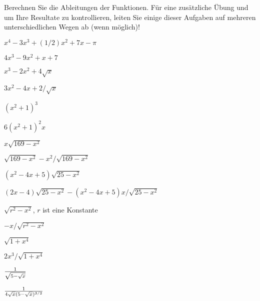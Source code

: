 \begin{exercises}

\noindent 
Berechnen Sie die Ableitungen der Funktionen. Für eine zusätzliche Übung und um Ihre Resultate zu kontrollieren, leiten Sie einige dieser Aufgaben auf mehreren unterschiedlichen Wegen ab (wenn möglich)!

\twocol

\begin{exercise} $x^4-3x^3+(1/2)x^2+7x-\pi$
\begin{answer} $4x^3-9x^2+x+7$
\end{answer}\end{exercise}

\begin{exercise} $x^3-2x^2+4\sqrt{x}$
\begin{answer} $3x^2-4x+2/\sqrt{x}$
\end{answer}\end{exercise}

\begin{exercise} $(x^2+1)^3$
\begin{answer} $6(x^2+1)^2x$
\end{answer}\end{exercise}

\begin{exercise} $x\sqrt{169-x^2}$
\begin{answer} $\sqrt{169-x^2}-x^2/\sqrt{169-x^2}$
\end{answer}\end{exercise}

\begin{exercise} $(x^2-4x+5)\sqrt{25-x^2}$
\begin{answer} $ (2x-4)\sqrt{25-x^2}-$\hfill\break$(x^2-4x+5)x/\sqrt{25-x^2}$
\end{answer}\end{exercise}

\begin{exercise} $\sqrt{r^2-x^2}$, $r$ ist eine Konstante
\begin{answer} $-x/\sqrt{r^2-x^2}$
\end{answer}\end{exercise}

\begin{exercise} $\sqrt{1+x^4}$
\begin{answer} $2x^3/\sqrt{1+x^4}$
\end{answer}\end{exercise}

\begin{exercise} ${1\over\sqrt{5-\sqrt{x}}}$
\begin{answer} ${1\over 4\sqrt{x}(5-\sqrt{x})^{3/2}}$
\end{answer}\end{exercise}


\end{exercises}
